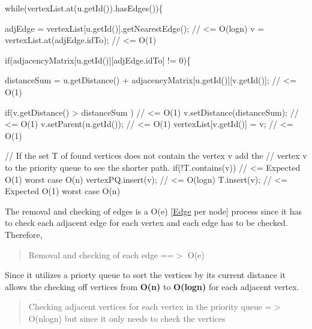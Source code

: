 \begin{DoxyCode}
\textcolor{keywordflow}{while}(vertexList.at(u.getId()).hasEdges())\{

    adjEdge = vertexList[u.getId()].getNearestEdge();                               \textcolor{comment}{// <= O(logn)}
    v = vertexList.at(adjEdge.idTo);                                                \textcolor{comment}{// <= O(1)}

    \textcolor{keywordflow}{if}(adjacencyMatrix[u.getId()][adjEdge.idTo] != 0)\{

        distanceSum = u.getDistance() + adjacencyMatrix[u.getId()][v.getId()];      \textcolor{comment}{// <= O(1)}

        \textcolor{keywordflow}{if}(v.getDistance() > distanceSum )                                          \textcolor{comment}{// <= O(1)}
            v.setDistance(distanceSum);                                             \textcolor{comment}{// <= O(1)}
            v.setParent(u.getId());                                                 \textcolor{comment}{// <= O(1)}
            vertexList[v.getId()] = v;                                              \textcolor{comment}{// <= O(1)}

        \textcolor{comment}{// If the set T of found vertices does not contain the vertex v add the}
        \textcolor{comment}{//  vertex v to the priority queue to see the shorter path.}
        \textcolor{keywordflow}{if}(!T.contains(v))          \textcolor{comment}{// <= Expected O(1) worst case O(n)}
            vertexPQ.insert(v);     \textcolor{comment}{// <= O(logn)}
            T.insert(v);            \textcolor{comment}{// <= Expected O(1) worst case O(n)}
\end{DoxyCode}
 The removal and checking of edges is a O(e) \mbox{[}\hyperlink{struct_edge}{Edge} per node\mbox{]} process since it has to check each adjacent edge for each vertex and each edge has to be checked. Therefore,

\begin{quote}
Removal and checking of each edge ==$>$ O(e) \end{quote}


Since it utilizes a priorty queue to sort the vertices by its current distance it allows the checking off vertices from {\bfseries O(n)} to {\bfseries O(logn)} for each adjacent vertex.

\begin{quote}
Checking adjacent vertices for each vertex in the priority queue =$>$ O(nlogn) but since it only needs to check the vertices \end{quote}


